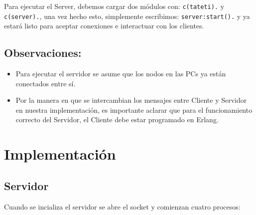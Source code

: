 \documentclass[11pt]{article}
\begin{document}
Para ejecutar el Server, debemos cargar dos módulos con: \texttt{c(tateti).} y \texttt{c(server).}, una
vez hecho esto, simplemente escribimos: \texttt{server:start().} y ya estará listo
para aceptar conexiones e interactuar con los clientes. \\

\subsection*{Observaciones:}

\begin{itemize}
    \item Para ejecutar el servidor se asume que los nodos en las PCs ya están
          conectados entre sí.
    \item Por la manera en que se intercambian los mensajes entre Cliente y Servidor 
          en nuestra implementación, es importante aclarar que para el funcionamiento
          correcto del Servidor, el Cliente debe estar programado en Erlang. 
\end{itemize}

\section*{Implementación}

\subsection*{Servidor}

Cuando se incializa el servidor se abre el socket y comienzan cuatro procesos:
\end{document}
